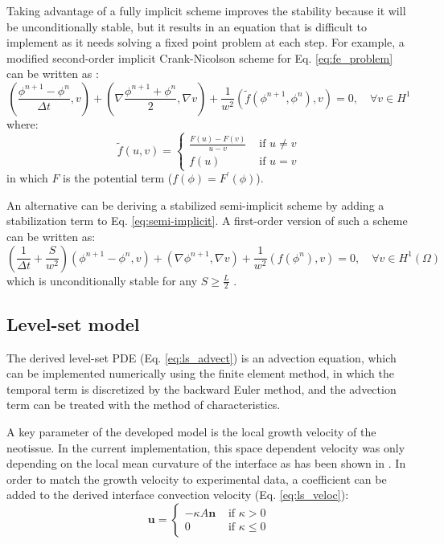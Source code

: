 Taking advantage of a fully implicit scheme improves the stability because it will be unconditionally stable, but it results in an equation that is difficult to implement as it needs solving a fixed point problem at each step. For example, a modified second-order implicit Crank-Nicolson scheme for Eq. \ref{eq:fe_problem} can be written as \cite{Abboud2019,Elliott1989}:
\begin{equation}
\left(\frac{\phi^{n+1}-\phi^{n}}{\Delta t}, v\right)+\left(\nabla \frac{\phi^{n+1}+\phi^{n}}{2}, \nabla v\right)+\frac{1}{w^{2}}\left(\tilde{f}\left(\phi^{n+1}, \phi^{n}\right), v\right)=0, \quad \forall v \in H^{1}
\end{equation}
where:
\begin{equation}
\tilde{f}(u, v)=\left\{\begin{array}{ll}
\frac{F(u)-F(v)}{u-v} & \text { if } u \neq v \\
f(u) & \text { if } u=v
\end{array}\right.
\end{equation}
in which $F$ is the potential term ($f(\phi)=F^{\prime}(\phi)$).

An alternative can be deriving a stabilized semi-implicit scheme by adding a stabilization term to Eq. \ref{eq:semi-implicit}. A first-order version of such a scheme can be written as:
\begin{equation}
\left(\frac{1}{\Delta t}+\frac{S}{w^{2}}\right)\left(\phi^{n+1}-\phi^{n}, v\right)+\left(\nabla \phi^{n+1}, \nabla v\right)+\frac{1}{w^{2}}\left(f\left(\phi^{n}\right), v\right)=0, \quad \forall v \in H^{1}(\Omega)
\end{equation}
which is unconditionally stable for any $S \geq \frac{L}{2}$ \cite{Shen2010}.


\subsection{Level-set model}

The derived level-set PDE (Eq. \ref{eq:ls_advect}) is an advection equation, which can be implemented numerically using the finite element method, in which the temporal term is discretized by the backward Euler method, and the advection term can be treated with the method of characteristics. 

A key parameter of the developed model is the local growth velocity of the neotissue. In the current implementation, this space dependent velocity was only depending on the local mean curvature of the interface as has been shown in \cite{Bidan2012a,Guyot2014}. In order to match the growth velocity to experimental data, a coefficient can be added to the derived interface convection velocity (Eq. \ref{eq:ls_veloc}):
\begin{equation} \label{eq:ls_veloc2}
\boldsymbol{u}=\left\{\begin{array}{ll}
-\kappa A \boldsymbol{n} & \text { if } \kappa>0 \\
0 & \text { if } \kappa \leq 0
\end{array}\right.
\end{equation}

